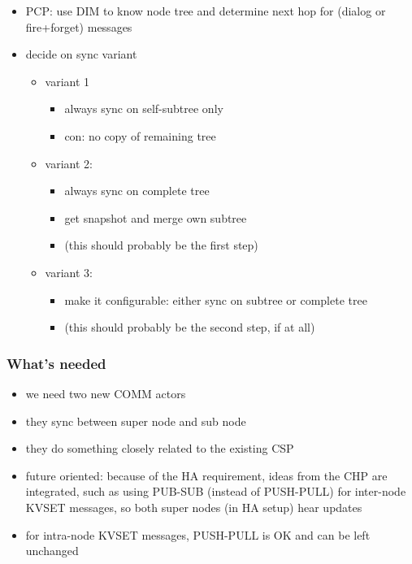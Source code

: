 \begin{itemize}
	\item PCP: use DIM to know node tree and determine next hop for (dialog or fire+forget) messages
	\item decide on sync variant
	\begin{itemize}
		\item variant 1
		\begin{itemize}
			\item always sync on self-subtree only
			\item con: no copy of remaining tree
		\end{itemize}

		\item variant 2:
		\begin{itemize}
			\item always sync on complete tree
			\item get snapshot and merge own subtree
			\item (this should probably be the first step)
		\end{itemize}

		\item variant 3:
		\begin{itemize}
			\item make it configurable: either sync on subtree or complete tree
			\item (this should probably be the second step, if at all)
		\end{itemize}
	\end{itemize}
\end{itemize}


\subsubsection{What's needed}
\begin{itemize}
	\item we need two new COMM actors
	\item they sync between super node and sub node
	\item they do something closely related to the existing CSP
	\item future oriented: because of the HA requirement, ideas from the CHP are integrated, such as using PUB-SUB (instead of PUSH-PULL) for inter-node KVSET messages, so both super nodes (in HA setup) hear updates
	\item for intra-node KVSET messages, PUSH-PULL is OK and can be left unchanged
\end{itemize}

